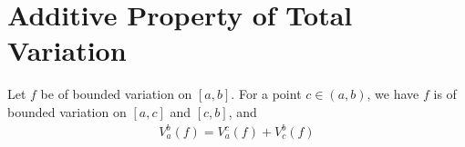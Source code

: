 \documentclass[thmcnt=section, 12pt]{my-elegantbook}
\begin{document}

\section{Additive Property of Total Variation}


\begin{theorem} \label{thm:34}
    Let $f$ be of bounded variation on $[a, b]$. For a point $c \in (a, b)$, we have $f$ is of bounded variation on $[a, c]$ and $[c, b]$, and
    \begin{align}
        V_a^b(f) = V_a^c(f) + V_c^b(f)
        \label{eq:79}
    \end{align}
\end{theorem}
\end{document}
